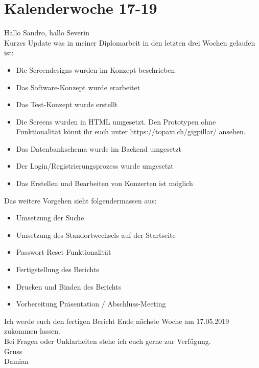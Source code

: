 \section{Kalenderwoche 17-19}

Hallo Sandro, hallo Severin\\

\noindent
Kurzes Update was in meiner Diplomarbeit in den letzten drei
Wochen gelaufen ist:

\begin{itemize}
  \tightlist{}
  \item{}Die Screendesigns wurden im Konzept beschrieben
  \item{}Das Software-Konzept wurde erarbeitet
  \item{}Das Test-Konzept wurde erstellt
  \item{}
        Die Screens wurden in HTML umgesetzt.
        Den Prototypen ohne Funktionalität könnt ihr euch unter
        https://topaxi.ch/gigpillar/ ansehen.
  \item{}Das Datenbankschema wurde im Backend umgesetzt
  \item{}Der Login/Registrierungsprozess wurde umgesetzt
  \item{}Das Erstellen und Bearbeiten von Konzerten ist möglich
\end{itemize}

\noindent
Das weitere Vorgehen sieht folgendermassen aus:

\begin{itemize}
  \tightlist{}
  \item{}Umsetzung der Suche
  \item{}Umsetzung des Standortwechsels auf der Startseite
  \item{}Passwort-Reset Funktionalität
  \item{}Fertigstellung des Berichts
  \item{}Drucken und Binden des Berichts
  \item{}Vorbereitung Präsentation / Abschluss-Meeting
\end{itemize}

\noindent
Ich werde euch den fertigen Bericht Ende nächste Woche am 17.05.2019
zukommen lassen.\\

\noindent
Bei Fragen oder Unklarheiten stehe ich euch gerne zur
Verfügung.\\

\noindent
Gruss\\
Damian
